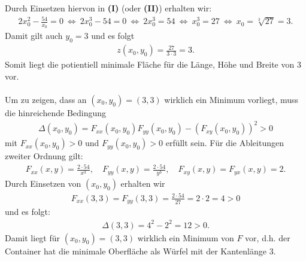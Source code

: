 Durch Einsetzen hiervon in \textbf{(I)} (oder \textbf{(II)}) erhalten wir:
\begin{align*}
	2x_0^2 - \frac{54}{x_0} = 0
	\ \Leftrightarrow \
	2 x_0^3 - 54 = 0
	\ \Leftrightarrow \
	2 x_0^3 = 54 
	\ \Leftrightarrow \
	x_0^3 = 27
	\ \Leftrightarrow \
	x_0 = \sqrt[3]{27} = 3.
\end{align*}
Damit gilt auch $y_0 = 3$ und es folgt 
\begin{align*}
	z(x_0,y_0) = \frac{27}{3 \cdot 3 } = 3.
\end{align*}
Somit liegt die potientiell minimale Fläche für die Länge, Höhe und Breite von $3$ vor.\\
\\
Um zu zeigen, dass an $(x_0,y_0) =(3,3)$ wirklich ein Minimum vorliegt, muss die hinreichende Bedingung
\begin{align*}
	\Delta(x_0,y_0)
	=F_{xx}(x_0,y_0)F_{yy}(x_0,y_0)
	- (F_{xy}(x_0,y_0))^2 > 0 
\end{align*}
mit $F_{xx}(x_0,y_0) > 0 $ und $F_{yy}(x_0,y_0)>0$ erfüllt sein.
Für die Ableitungen zweiter Ordnung gilt:
\begin{align*}
	F_{xx}(x,y)
	=
	\frac{2 \cdot 54}{x^3}, 
	\quad
	F_{yy}(x,y)
	=
	\frac{2 \cdot 54}{y^3},
	\quad
	F_{xy}(x,y)
	=
	F_{yx}(x,y) = 2.
\end{align*}
Durch Einsetzen von $(x_0,y_0)$ erhalten wir
\begin{align*}
	F_{xx}(3,3) = F_{yy}(3,3) = \frac{2 \cdot 54}{27} = 2 \cdot 2 = 4 > 0
\end{align*}
und es folgt:
\begin{align*}
	\Delta(3,3) = 4^2 - 2^2 = 12 > 0.
\end{align*}
Damit liegt für $(x_0,y_0) = (3,3)$ wirklich ein Minimum von $F$ vor, d.h. der Container hat die minimale Oberfläche als Würfel mit der Kantenlänge $3$.

\newpage

